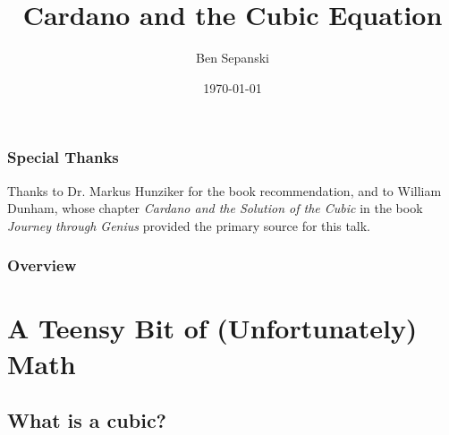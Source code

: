 \documentclass{beamer}
\title[Cardano \& the Cubic]{Cardano and the Cubic Equation} %
\author{Ben Sepanski} %
\date{\today} %
\begin{document}
\begin{frame}
\titlepage %
\end{frame}

\begin{frame}
\frametitle{Special Thanks}
Thanks to Dr. Markus Hunziker for the book recommendation, and to
William Dunham, whose chapter {\it Cardano and the Solution of the
Cubic} in the book {\it Journey through Genius} provided the primary
source for this talk.
\end{frame}

\begin{frame}
\frametitle{Overview} %
\tableofcontents %
\end{frame}


\section{A Teensy Bit of (Unfortunately) Math} 

\subsection{What is a cubic?}
\end{document}
